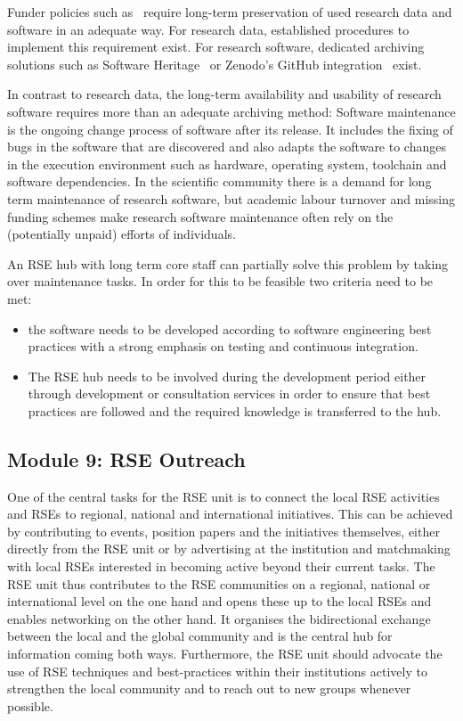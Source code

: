 \documentclass[a4paper]{article}
\begin{document}
Funder policies such as~\autocite{dfg_gsp} require long-term preservation of used research data and software in an adequate way.
For research data, established procedures to implement this requirement exist.
For research software, dedicated archiving solutions such as Software Heritage~\autocite{DiCosmo2020,DiCosmo2023} or Zenodo's GitHub integration~\autocite{GitHubZenodo} exist.

In contrast to research data, the long-term availability and usability of research software requires more than an adequate archiving method:
Software maintenance is the ongoing change process of software after its release.
It includes the fixing of bugs in the software that are discovered and also adapts the software to changes in the execution environment such as hardware, operating system, toolchain and software dependencies.
In the scientific community there is a demand for long term maintenance of research software,
but academic labour turnover and missing funding schemes make research software maintenance often rely on the (potentially unpaid) efforts of individuals.

An RSE hub with long term core staff can partially solve this problem by taking over maintenance tasks.
In order for this to be feasible two criteria need to be met:
\begin{itemize}
\item the software needs to be developed according to software engineering best practices with a strong emphasis on testing and continuous integration.
\item The RSE hub needs to be involved during the development period either through development or consultation services in order to ensure that best practices are followed and the required knowledge is transferred to the hub.
\end{itemize}

\subsection{Module 9: RSE Outreach}%
\label{sec:outreach}

One of the central tasks for the RSE unit is to connect the local RSE activities and RSEs to regional, national and international initiatives.
This can be achieved by contributing to events, position papers and the initiatives themselves,
either directly from the RSE unit or by advertising at the institution and matchmaking with local RSEs interested in becoming active beyond their current tasks.
The RSE unit thus contributes to the RSE communities on a regional, national or international level on the one hand and opens these up to the local RSEs and enables networking on the other hand.
It organises the bidirectional exchange between the local and the global community and is the central hub for information coming both ways.
Furthermore, the RSE unit should advocate the use of RSE techniques and best-practices within their institutions actively to strengthen the local community and to reach out to new groups whenever possible.
\end{document}
